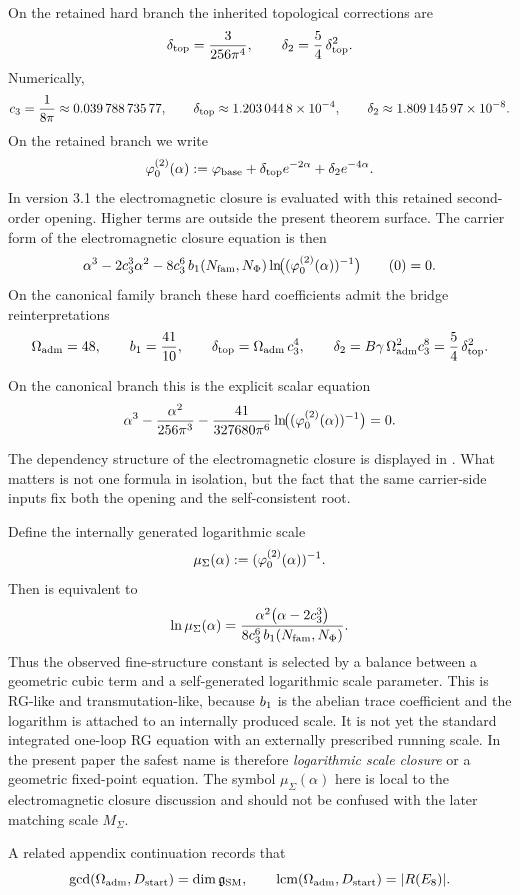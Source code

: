 On the retained hard branch the inherited topological corrections are
\begin{equation}
\label{eq:hard-topological-kernel}
\delta_{\mathrm{top}}=\frac{3}{256\pi^4},
\qquad
\delta_2=\frac54\,\delta_{\mathrm{top}}^2.
\end{equation}
Numerically,
\[
c_3=\frac{1}{8\pi}\approx \num{0.03978873577},
\qquad
\delta_{\mathrm{top}}\approx \num{1.2030448e-4},
\qquad
\delta_2\approx \num{1.80914597e-8}.
\]
On the retained branch we write
\begin{equation}
\label{eq:phi-opening}
\varphi_0^{(2)}(\alpha)
:=
\varphi_{\mathrm{base}}
+ \delta_{\mathrm{top}} e^{-2\alpha}
+ \delta_2 e^{-4\alpha}.
\end{equation}
In version 3.1 the electromagnetic closure is evaluated with this retained
second-order opening. Higher terms are outside the present theorem surface.
The carrier form of the electromagnetic closure equation is then
\label{eq:carrier-cfe}
\[
\alpha^3
-2c_3^3\alpha^2
-8c_3^6\,b_1(N_{\mathrm{fam}},N_\Phi)
\ln\!\bigl((\varphi_0^{(2)}(\alpha))^{-1}\bigr)\tag{\theequation}
=0.
\]
On the canonical family branch these hard coefficients admit the bridge reinterpretations
\[
\Omega_{\mathrm{adm}}=48,
\qquad
b_1=\frac{41}{10},
\qquad
\delta_{\mathrm{top}}=\Omega_{\mathrm{adm}}\,c_3^4,
\qquad
\delta_2=B\gamma\,\Omega_{\mathrm{adm}}^2c_3^8=\frac54\,\delta_{\mathrm{top}}^2.
\]

On the canonical branch this is the explicit scalar equation
\[
\alpha^3-\frac{\alpha^2}{256\pi^3}-\frac{41}{327680\pi^6}\ln\!\bigl((\varphi_0^{(2)}(\alpha))^{-1}\bigr)=0.
\]

The dependency structure of the electromagnetic closure is displayed in . What matters is not one formula in isolation, but the fact that the same carrier-side inputs fix both the opening and the self-consistent root.
\begin{remark}
Define the internally generated logarithmic scale
\[
\mu_\Sigma(\alpha):=(\varphi_0^{(2)}(\alpha))^{-1}.
\]
Then  is equivalent to
\[
\ln \mu_\Sigma(\alpha)
=
\frac{\alpha^2\bigl(\alpha-2c_3^3\bigr)}
{8c_3^6\,b_1(N_{\mathrm{fam}},N_\Phi)}.
\]
Thus the observed fine-structure constant is selected by a balance between a geometric cubic term and a self-generated logarithmic scale parameter. This is RG-like and transmutation-like, because $b_1$ is the abelian trace coefficient and the logarithm is attached to an internally produced scale. It is not yet the standard integrated one-loop RG equation with an externally prescribed running scale. In the present paper the safest name is therefore \emph{logarithmic scale closure} or a geometric fixed-point equation. The symbol $\mu_\Sigma(\alpha)$ here is local to the electromagnetic closure discussion and should not be confused with the later matching scale $M_\Sigma$.
\end{remark}
A related appendix continuation records that
\[
\gcd(\Omega_{\mathrm{adm}},D_{\mathrm{start}})=\dim \mathfrak g_{\mathrm{SM}},
\qquad
\operatorname{lcm}(\Omega_{\mathrm{adm}},D_{\mathrm{start}})=|R(E_8)|.
\]

